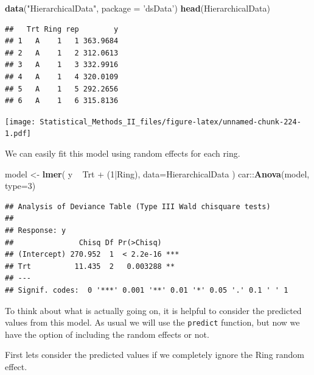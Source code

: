 \documentclass[]{book}
\newenvironment{Shaded}{\begin{snugshade}}{\end{snugshade}}
\newcommand{\KeywordTok}[1]{\textcolor[rgb]{0.13,0.29,0.53}{\textbf{{#1}}}}
\newcommand{\DataTypeTok}[1]{\textcolor[rgb]{0.13,0.29,0.53}{{#1}}}
\newcommand{\DecValTok}[1]{\textcolor[rgb]{0.00,0.00,0.81}{{#1}}}
\newcommand{\FloatTok}[1]{\textcolor[rgb]{0.00,0.00,0.81}{{#1}}}
\newcommand{\StringTok}[1]{\textcolor[rgb]{0.31,0.60,0.02}{{#1}}}
\newcommand{\CommentTok}[1]{\textcolor[rgb]{0.56,0.35,0.01}{\textit{{#1}}}}
\newcommand{\NormalTok}[1]{{#1}}
\theoremstyle{definition}
\theoremstyle{definition}
\theoremstyle{remark}
\begin{document}
\begin{Shaded}
\begin{Highlighting}[]
\KeywordTok{data}\NormalTok{(}\StringTok{"HierarchicalData"}\NormalTok{, }\DataTypeTok{package =} \StringTok{'dsData'}\NormalTok{)}
\KeywordTok{head}\NormalTok{(HierarchicalData)}
\end{Highlighting}
\end{Shaded}

\begin{verbatim}
##   Trt Ring rep        y
## 1   A    1   1 363.9684
## 2   A    1   2 312.0613
## 3   A    1   3 332.9916
## 4   A    1   4 320.0109
## 5   A    1   5 292.2656
## 6   A    1   6 315.8136
\end{verbatim}

\texttt{[image: Statistical\_Methods\_II\_files/figure-latex/unnamed-chunk-224-1.pdf]}

We can easily fit this model using random effects for each ring.

\begin{Shaded}
\begin{Highlighting}[]
\NormalTok{model <-}\StringTok{ }\KeywordTok{lmer}\NormalTok{( y ~}\StringTok{ }\NormalTok{Trt +}\StringTok{ }\NormalTok{(}\DecValTok{1}\NormalTok{|Ring), }\DataTypeTok{data=}\NormalTok{HierarchicalData )}
\NormalTok{car::}\KeywordTok{Anova}\NormalTok{(model, }\DataTypeTok{type=}\DecValTok{3}\NormalTok{)}
\end{Highlighting}
\end{Shaded}

\begin{verbatim}
## Analysis of Deviance Table (Type III Wald chisquare tests)
## 
## Response: y
##               Chisq Df Pr(>Chisq)    
## (Intercept) 270.952  1  < 2.2e-16 ***
## Trt          11.435  2   0.003288 ** 
## ---
## Signif. codes:  0 '***' 0.001 '**' 0.01 '*' 0.05 '.' 0.1 ' ' 1
\end{verbatim}

To think about what is actually going on, it is helpful to consider the
predicted values from this model. As usual we will use the
\texttt{predict} function, but now we have the option of including the
random effects or not.

First lets consider the predicted values if we completely ignore the
Ring random effect.

\begin{Shaded}
\end{Shaded}
\end{document}
